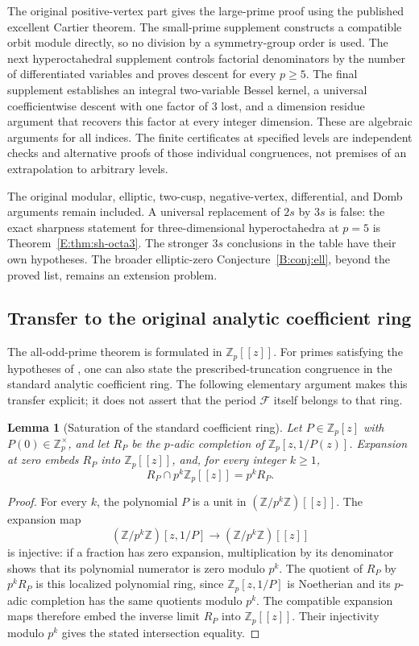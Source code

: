 \documentclass[11pt,a4paper]{article}
\newtheorem{lemma}[theorem]{Lemma}
\theoremstyle{definition}\newtheorem{definition}[theorem]{Definition}
\theoremstyle{remark}\newtheorem{remark}[theorem]{Remark}
\numberwithin{equation}{section}
\begin{document}
The original positive-vertex part gives the large-prime proof using
the published excellent Cartier theorem. The small-prime supplement
constructs a compatible orbit module directly, so no division by a
symmetry-group order is used. The next hyperoctahedral supplement
controls factorial denominators by the number of differentiated
variables and proves descent for every $p\ge5$. The final supplement
establishes an integral two-variable Bessel kernel, a universal
coefficientwise descent with one factor of $3$ lost, and a dimension
residue argument that recovers this factor at every integer dimension.
These are algebraic arguments for all indices. The finite certificates
at specified levels are independent checks and alternative proofs of
those individual congruences, not premises of an extrapolation to
arbitrary levels.

The original modular, elliptic, two-cusp, negative-vertex, differential,
and Domb arguments remain included. A universal replacement of $2s$
by $3s$ is false: the exact sharpness statement for three-dimensional
hyperoctahedra at $p=5$ is Theorem~\ref{E:thm:sh-octa3}. The stronger
$3s$ conclusions in the table have their own hypotheses. The broader
elliptic-zero Conjecture~\ref{B:conj:ell}, beyond the proved list,
remains an extension problem.

\subsection{Transfer to the original analytic coefficient ring}
\label{G:sec:analytic-transfer}
The all-odd-prime theorem is formulated in $\mathbb Z_p[[z]]$.
For primes satisfying the hypotheses of \cite[Theorem~7.3]{BV3},
one can also state the prescribed-truncation congruence in the
standard analytic coefficient ring. The following elementary
argument makes this transfer explicit; it does not assert that the
period $\mathcal F$ itself belongs to that ring.

\begin{lemma}[Saturation of the standard coefficient ring]
\label{G:lem:saturation}
Let $P\in\mathbb Z_p[z]$ with $P(0)\in\mathbb Z_p^\times$, and let
$R_P$ be the $p$-adic completion of $\mathbb Z_p[z,1/P(z)]$.
Expansion at zero embeds $R_P$ into $\mathbb Z_p[[z]]$, and, for
every integer $k\ge1$,
\[
 R_P\cap p^k\mathbb Z_p[[z]]=p^kR_P.
\]
\end{lemma}

\begin{proof}
For every $k$, the polynomial $P$ is a unit in
$(\mathbb Z/p^k\mathbb Z)[[z]]$. The expansion map
\[
 (\mathbb Z/p^k\mathbb Z)[z,1/P]
       \longrightarrow(\mathbb Z/p^k\mathbb Z)[[z]]
\]
is injective: if a fraction has zero expansion, multiplication by
its denominator shows that its polynomial numerator is zero modulo
$p^k$. The quotient of $R_P$ by $p^kR_P$ is this localized
polynomial ring, since $\mathbb Z_p[z,1/P]$ is Noetherian and its
$p$-adic completion has the same quotients modulo $p^k$.
The compatible expansion maps therefore embed the inverse limit
$R_P$ into $\mathbb Z_p[[z]]$. Their injectivity modulo $p^k$
gives the stated intersection equality.
\end{proof}
\end{document}
